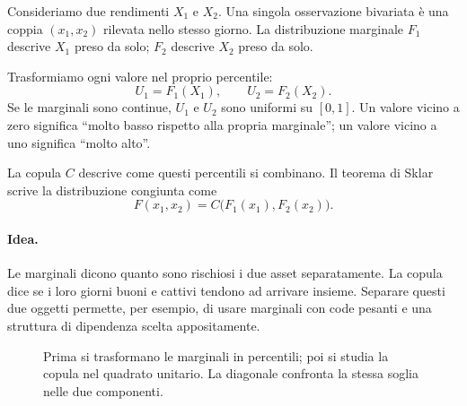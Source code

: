 \documentclass[11pt,a4paper]{article}
\newcommand{\Idea}{\paragraph{Idea.}}
\begin{document}
Consideriamo due rendimenti $X_1$ e $X_2$. Una singola osservazione bivariata è
una coppia $(x_1,x_2)$ rilevata nello stesso giorno. La distribuzione marginale
$F_1$ descrive $X_1$ preso da solo; $F_2$ descrive $X_2$ preso da solo.

Trasformiamo ogni valore nel proprio percentile:
\[
 U_1=F_1(X_1),\qquad U_2=F_2(X_2).
\]
Se le marginali sono continue, $U_1$ e $U_2$ sono uniformi su $[0,1]$. Un
valore vicino a zero significa ``molto basso rispetto alla propria marginale'';
un valore vicino a uno significa ``molto alto''.

La copula $C$ descrive come questi percentili si combinano. Il teorema di Sklar
scrive la distribuzione congiunta come
\begin{equation}
 F(x_1,x_2)=C\bigl(F_1(x_1),F_2(x_2)\bigr).
 \label{eq:sklar}
\end{equation}

\Idea Le marginali dicono quanto sono rischiosi i due asset separatamente. La
copula dice se i loro giorni buoni e cattivi tendono ad arrivare insieme.
Separare questi due oggetti permette, per esempio, di usare marginali con code
pesanti e una struttura di dipendenza scelta appositamente.

\begin{figure}[ht]
\centering
{}

\vspace{0.8em}
\caption{Prima si trasformano le marginali in percentili; poi si studia la copula nel quadrato unitario. La diagonale confronta la stessa soglia nelle due componenti.}
\label{fig:copula-square}
\end{figure}
\end{document}
